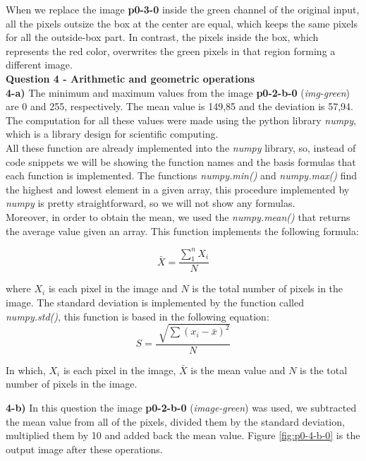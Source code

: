 \documentclass[12pt,a4paper]{article}
\begin{document}
When we replace the image \textbf{p0-3-0} inside the green channel of the original input, all the pixels outsize the box at the center are equal, which keeps the same pixels for all the outside-box part. In contrast, the pixels inside the box, which represents the red color, overwrites the green pixels in that region forming a different image. \\


\textbf{Question 4 - Arithmetic and geometric operations} \\

\textbf{4-a) } The minimum and maximum values from the image \textbf{p0-2-b-0} (\emph{img-green}) are 0 and 255, respectively. The mean value is 149,85 and the deviation is 57,94. The computation for all these values were made using the python library \emph{numpy}, which is a library design for scientific computing. \\

All these function are already implemented into the \emph{numpy} library, so, instead of code snippets we will be showing the function names and the basis formulas that each function is implemented. The functions \emph{numpy.min()} and  \emph{numpy.max()} find the highest and lowest element in a given array, this procedure implemented by \emph{numpy} is pretty straightforward, so we will not show any formulas. \\

Moreover, in order to obtain the mean, we used the \emph{numpy.mean()} that returns the average value given an array. This function implements the following formula: 

$$\bar X = \frac{\sum_{1}^{n} X_i}{N}$$

where $X_i$ is each pixel in the image and $N$ is the total number of pixels in the image. The standard deviation is implemented by the function called \emph{numpy.std()}, this function is based in the following equation:
$$ S = \frac{\sqrt[]{\sum {(x_i - \bar{x})^2}}}{N} $$

In which, $X_i$ is each pixel in the image, $\bar X$ is the mean value and $N$ is the total number of pixels in the image.

\newpage

\textbf{4-b) } In this question the image \textbf{p0-2-b-0} (\emph{image-green}) was used, we subtracted the mean value from all of the pixels, divided them by the standard deviation, multiplied them by 10 and added back the mean value. Figure \ref{fig:p0-4-b-0} is the output image after these operations.
\end{document}
